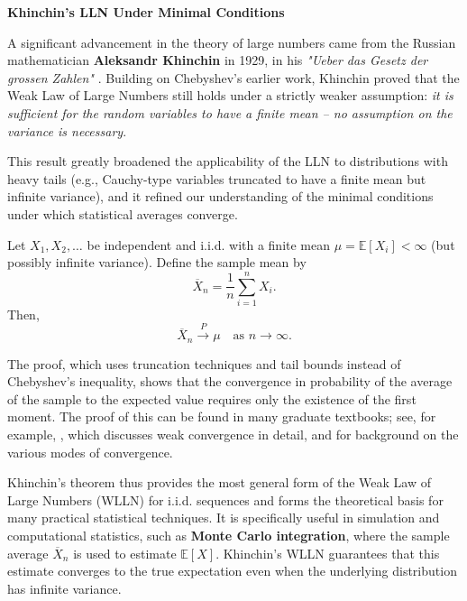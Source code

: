 \vspace{1em}
\noindent\textbf{Khinchin’s LLN Under Minimal Conditions}
\vspace{0.5em}

A significant advancement in the theory of large numbers came from the Russian mathematician \textbf{Aleksandr Khinchin} in 1929, in his \emph{"Ueber das Gesetz der grossen Zahlen"} \citep{Khinchin1929}. Building on Chebyshev’s earlier work, Khinchin proved that the Weak Law of Large Numbers still holds under a strictly weaker assumption: \textit{it is sufficient for the random variables to have a finite mean -- no assumption on the variance is necessary}.

This result greatly broadened the applicability of the LLN to distributions with heavy tails (e.g., Cauchy-type variables truncated to have a finite mean but infinite variance), and it refined our understanding of the minimal conditions under which statistical averages converge.

\begin{theorem}
Let $X_1, X_2, \dots$ be independent and i.i.d. with a finite mean $\mu = \mathbb{E}[X_i] < \infty$ (but possibly infinite variance). Define the sample mean by
\[
\overline{X}_n = \frac{1}{n} \sum_{i=1}^n X_i.
\]
Then,
\[
\overline{X}_n \xrightarrow{P} \mu \quad \text{as } n \to \infty.
\]
\end{theorem}

The proof, which uses truncation techniques and tail bounds instead of Chebyshev’s inequality, shows that the convergence in probability of the average of the sample to the expected value requires only the existence of the first moment. The proof of this can be found in many graduate textbooks; see, for example, \cite{billingsley2013convergence}, which discusses weak convergence in detail, and \cite{proschan2018essentials} for background on the various modes of convergence.

\medskip

Khinchin’s theorem thus provides the most general form of the Weak Law of Large Numbers (WLLN) for i.i.d. sequences and forms the theoretical basis for many practical statistical techniques. It is specifically useful in simulation and computational statistics, such as \textbf{Monte Carlo integration}, where the sample average \( \overline{X}_n \) is used to estimate \( \mathbb{E}[X] \). Khinchin’s WLLN guarantees that this estimate converges to the true expectation even when the underlying distribution has infinite variance. 

